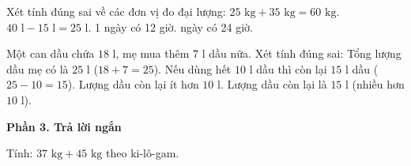\begin{ex} %
Xét tính đúng sai về các đơn vị đo đại lượng:
\choiceTF
{\True $25\text{ kg} + 35\text{ kg} = 60\text{ kg}$.}
{\True $40\text{ l} - 15\text{ l} = 25\text{ l}$.}
{1 ngày có 12 giờ.}
{ ngày có 24 giờ.}
\end{ex}

\begin{ex} %
Một can dầu chứa $18\text{ l}$, mẹ mua thêm $7\text{ l}$ dầu nữa. Xét tính đúng sai:
\choiceTF
{\True Tổng lượng dầu mẹ có là $25\text{ l}$ ($18 + 7 = 25$).}
{\True Nếu dùng hết $10\text{ l}$ dầu thì còn lại $15\text{ l}$ dầu ($25 - 10 = 15$).}
{Lượng dầu còn lại ít hơn $10\text{ l}$.}
{\True Lượng dầu còn lại là $15\text{ l}$ (nhiều hơn $10\text{ l}$).}
\end{ex}

\textbf{Phần 3. Trả lời ngắn}

\begin{ex} %
Tính: $37\text{ kg} + 45\text{ kg}$ theo ki-lô-gam.
\end{ex}

